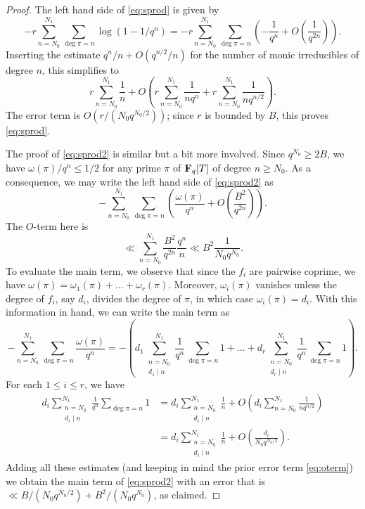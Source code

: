 \documentclass[a4paper]{compositio}
\begin{document}
\begin{proof} The left hand side of \eqref{eq:sprod} is given by
\[ - r \sum_{n=N_0}^{N_1}\sum_{\deg{\pi}=n} \log(1-1/q^n)=  -r \sum_{n=N_0}^{N_1} \sum_{\deg{\pi}=n} \left(-\frac{1}{q^n} + O\left(\frac{1}{q^{2n}}\right)\right).
\] Inserting the estimate $q^n/n + O(q^{n/2}/n)$ for the number of monic irreducibles of
degree $n$, this simplifies to
\[ r \sum_{n=N_0}^{N_1} \frac{1}{n} + O\left(r \sum_{n=N_0}^{N_1} \frac{1}{n q^n} + r \sum_{n=N_0}^{N_1} \frac{1}{n q^{n/2}}\right). \]
The error term is $O(r/(N_0 q^{N_0/2}))$; since $r$ is bounded by
$B$, this proves \eqref{eq:sprod}.

The proof of \eqref{eq:sprod2} is similar but a bit more involved.
Since $q^{N_0} \geq 2B$, we have $\omega(\pi)/q^n \leq 1/2$ for any
prime $\pi$ of $\mathbf{F}_q[T]$ of degree $n \geq N_0$. As a consequence,
we may write the left hand side of \eqref{eq:sprod2} as
\[ -\sum_{n=N_0}^{N_1} \sum_{\deg\pi = n}\left(\frac{\omega(\pi)}{q^n} + O\left(\frac{B^2}{q^{2n}}\right)\right). \]
The $O$-term here is
\begin{equation}\label{eq:oterm}
 \ll \sum_{n=N_0}^{N_1} \frac{B^2}{q^{2n}} \frac{q^n}{n} \ll B^2 \frac{1}{N_0 q^{N_0}}.
\end{equation}
To evaluate the main term, we observe that since the $f_i$ are
pairwise coprime, we have $\omega(\pi) = \omega_1(\pi) + \dots +
\omega_r(\pi)$. Moreover, $\omega_i(\pi)$ vanishes unless the degree
of $f_i$, say $d_i$, divides the degree of $\pi$, in which case
$\omega_i(\pi)=d_i$. With this information in hand, we can write the
main term as
\[ -\sum_{n=N_0}^{N_1} \sum_{\deg\pi=n} \frac{\omega(\pi)}{q^n} = -
\left(d_1 \sum_{\substack{n=N_0 \\ d_1 \mid
n}}^{N_1}\frac{1}{q^n}\sum_{\deg{\pi}=n}{1} + \dots +d_r
\sum_{\substack{n=N_0 \\ d_r \mid
n}}^{N_1}\frac{1}{q^n}\sum_{\deg{\pi}=n}{1}\right).\] For each $1
\leq i \leq r$, we have
\begin{align*}
 d_i \sum_{\substack{n=N_0 \\ d_i \mid
n}}^{N_1}\frac{1}{q^n}\sum_{\deg{\pi}=n}{1} &= d_i
\sum_{\substack{n=N_0 \\ d_i \mid n}}^{N_1}\frac{1}{n} + O\left(d_i
\sum_{n=N_0}^{N_1}\frac{1}{n q^{n/2}} \right) \\ &= d_i
\sum_{\substack{n=N_0 \\ d_i \mid n}}^{N_1}\frac{1}{n} +
O\left(\frac{d_i}{N_0 q^{N_0/2}}\right).
\end{align*}
Adding all these estimates (and keeping in mind the prior error term
\eqref{eq:oterm}) we obtain the main term of \eqref{eq:sprod2} with
an error that is $\ll B/(N_0 q^{N_0/2}) + B^2/(N_0 q^{N_0})$, as
claimed.
\end{proof}
\end{document}
